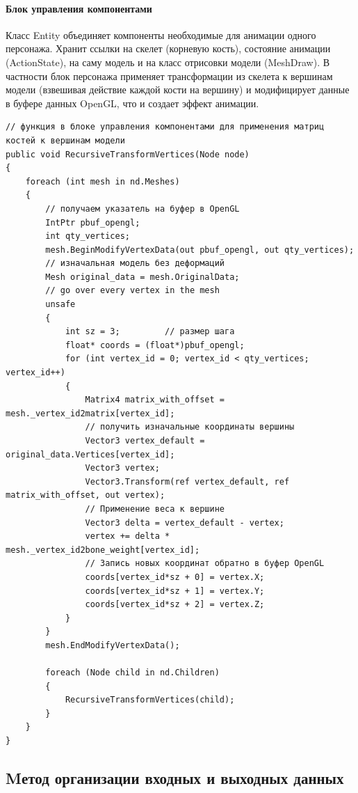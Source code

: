 \paragraph{Блок управления компонентами}
Класс Entity объединяет компоненты необходимые для анимации одного персонажа. Хранит ссылки на скелет (корневую кость), состояние анимации (ActionState), на саму модель и на класс отрисовки модели (MeshDraw).
    \medskip
    В частности блок персонажа применяет трансформации из скелета к вершинам модели (взвешивая действие каждой кости на вершину) и модифицирует данные в буфере данных OpenGL, что и создает эффект анимации.
    
\begin{verbatim}
// функция в блоке управления компонентами для применения матриц костей к вершинам модели
public void RecursiveTransformVertices(Node node)
{
    foreach (int mesh in nd.Meshes)
    {
        // получаем указатель на буфер в OpenGL
        IntPtr pbuf_opengl;
        int qty_vertices;
        mesh.BeginModifyVertexData(out pbuf_opengl, out qty_vertices);
        // изначальная модель без деформаций
        Mesh original_data = mesh.OriginalData;
        // go over every vertex in the mesh
        unsafe
        {
            int sz = 3;         // размер шага
            float* coords = (float*)pbuf_opengl;
            for (int vertex_id = 0; vertex_id < qty_vertices; vertex_id++)
            {
                Matrix4 matrix_with_offset = mesh._vertex_id2matrix[vertex_id];
                // получить изначальные координаты вершины
                Vector3 vertex_default = original_data.Vertices[vertex_id];
                Vector3 vertex;
                Vector3.Transform(ref vertex_default, ref matrix_with_offset, out vertex);
                // Применение веса к вершине
                Vector3 delta = vertex_default - vertex;
                vertex += delta *  mesh._vertex_id2bone_weight[vertex_id];
                // Запись новых координат обратно в буфер OpenGL
                coords[vertex_id*sz + 0] = vertex.X;
                coords[vertex_id*sz + 1] = vertex.Y;
                coords[vertex_id*sz + 2] = vertex.Z;
            }
        }
        mesh.EndModifyVertexData();

        foreach (Node child in nd.Children)
        {
            RecursiveTransformVertices(child);
        }
    }
}
\end{verbatim}


\subsection{Mетод организации входных и выходных данных}


